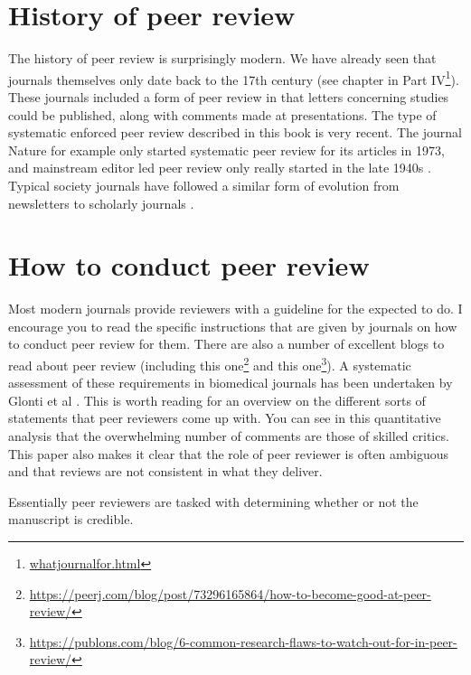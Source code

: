 \documentclass[
]{krantz}
\renewcommand{\href}[2]{#2\footnote{\url{#1}}}
\begin{document}
\hypertarget{history-of-peer-review}{%
\section{History of peer review}\label{history-of-peer-review}}

The history of peer review is surprisingly modern. We have already seen that journals themselves only date back to the 17th century (see chapter in \href{whatjournalfor.html}{Part IV}). These journals included a form of peer review in that letters concerning studies could be published, along with comments made at presentations. The type of systematic enforced peer review described in this book is very recent. The journal Nature for example only started systematic peer review for its articles in 1973, and mainstream editor led peer review only really started in the late 1940s \citep[see][]{tennant2017open}. Typical society journals have followed a similar form of evolution from newsletters to scholarly journals \citep{measey2011past}.

\hypertarget{how-to-conduct-peer-review}{%
\section{How to conduct peer review}\label{how-to-conduct-peer-review}}

Most modern journals provide reviewers with a guideline for the expected to do. I encourage you to read the specific instructions that are given by journals on how to conduct peer review for them. There are also a number of excellent blogs to read about peer review (including this \href{https://peerj.com/blog/post/73296165864/how-to-become-good-at-peer-review/}{one} and this \href{https://publons.com/blog/6-common-research-flaws-to-watch-out-for-in-peer-review/}{one}). A systematic assessment of these requirements in biomedical journals has been undertaken by Glonti et al \citeyearpar{glonti2019scoping}. This is worth reading for an overview on the different sorts of statements that peer reviewers come up with. You can see in this quantitative analysis that the overwhelming number of comments are those of skilled critics. This paper also makes it clear that the role of peer reviewer is often ambiguous and that reviews are not consistent in what they deliver.

Essentially peer reviewers are tasked with determining whether or not the manuscript is credible.
\end{document}
